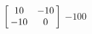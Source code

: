 {$\left[\hskip -3pt \begin{array}{cc} 10&-10\\  -10&0\end {array} \hskip -3pt
 \right]$} 
{$-100$}



  

